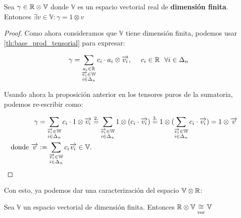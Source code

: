 \begin{proposicion} \label{prop:r_otimes_v_es_v}
	Sea $\gamma \in \mathbb{R} \otimes \mathbb{V}$ donde $\mathbb{V}$ es un espacio vectorial real de \textbf{dimensión finita}. Entonces $\exists v \in \mathbb{V}: \gamma = 1 \otimes v$
\end{proposicion}
\begin{proof}
	Como ahora consideramos que $\mathbb{V}$ tiene dimensión finita, podemos usar \ref{th:base_prod_tensorial} para expresar:

	\begin{equation}
		\gamma = \sum_{\substack{a_i \in \mathbb{R}\\ \overrightarrow{v_i} \in \mathbb{W}\\ i \in \Delta_{n}}} c_{i} \cdot a_i \otimes \overrightarrow{v_i}, \ \ \ \  c_{i} \in \mathbb{R} \ \  \forall i \in \Delta_{n}
	\end{equation}

	Usando ahora la proposición anterior en los tensores puros de la sumatoria, podemos re-escribir como:

	\begin{equation}
		\begin{split}
			\gamma &= \sum_{\substack{\overrightarrow{v_i} \in \mathbb{W}\\ i \in \Delta_{n}}} c_{i} \cdot 1 \otimes \overrightarrow{v_i} \stackrel{\text{2.}}{=} \sum_{\substack{\overrightarrow{v_i} \in \mathbb{W}\\ i \in \Delta_{n}}} 1 \otimes (c_{i} \cdot \overrightarrow{v_i}) \stackrel{\text{3.}}{=} 1 \otimes ( \sum_{\substack{\overrightarrow{v_i} \in \mathbb{W} \\ i \in \Delta_{n}}} c_{i} \cdot \overrightarrow{v_i} ) = 1 \otimes \overrightarrow{v} \ \ \ \  \\
			\text{donde } \overrightarrow{v} &:= \sum_{\substack{\overrightarrow{v_i} \in \mathbb{W}\\ i \in \Delta_{n}}} c_{i} \overrightarrow{v_i} \in \mathbb{V}. \\
		\end{split}
	\end{equation}

\end{proof}

Con esto, ya podemos dar una caracterización del espacio $\mathbb{V} \otimes \mathbb{R}$:

\begin{proposicion}
	Sea $\mathbb{V}$ un espacio vectorial de dimensión finita. Entonces $\mathbb{R} \otimes \mathbb{V} \underset{\text{vec}}{\cong} \mathbb{V}$
\end{proposicion}

